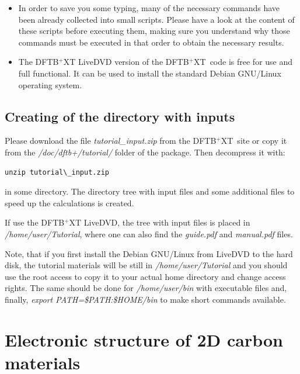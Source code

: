 \documentclass[a4paper,11pt,english]{sphinxmanual}
\newcommand{\dftbpxt}{\textsf{DFTB$^{\text{+}}$XT\ }} %
\begin{document}
{{\begin{itemize}
\item {} 
In order to save you some typing, many of the necessary commands
have been already collected into small scripts. Please have a look
at the content of these scripts before executing them, making sure
you understand why those commands must be executed in that order to
obtain the necessary results.

\item {} 
The {\textsf{DFTB$^{\text{+}}$XT LiveDVD}} version of the \dftbpxt code is free for use and full functional.
It can be used to install the standard Debian GNU/Linux operating system.

\end{itemize}

\section{Creating of the directory with inputs}

Please download the file \emph{tutorial\_input.zip} from the \dftbpxt site or copy it from the \emph{/doc/dftb+/tutorial/} folder of the package. Then decompress it with:
%
\begin{Verbatim}[commandchars=\\\{\}]
unzip tutorial\_input.zip
\end{Verbatim}

in some directory. The directory tree with input files and some additional files to speed up the calculations is created.

\null
If use the {\textsf{DFTB$^{\text{+}}$XT LiveDVD}}, the tree with input files is placed in \emph{/home/user/Tutorial}, where one can also find the \emph{guide.pdf} and \emph{manual.pdf} files.

\null
Note, that if you first install the Debian GNU/Linux from LiveDVD to the hard disk, the tutorial materials will be still in \emph{/home/user/Tutorial} and you should use the root access to copy it to your actual home directory and change access rights. The same should be done for \emph{/home/user/bin} with executable files and, finally, \emph{export PATH=\$PATH:\$HOME/bin} to make short commands available.

\chapter{Electronic structure of 2D carbon materials}
\label{electstruct:electronic-structure-of-2d-carbon-materials}\label{electstruct::doc}

}}
\end{document}
